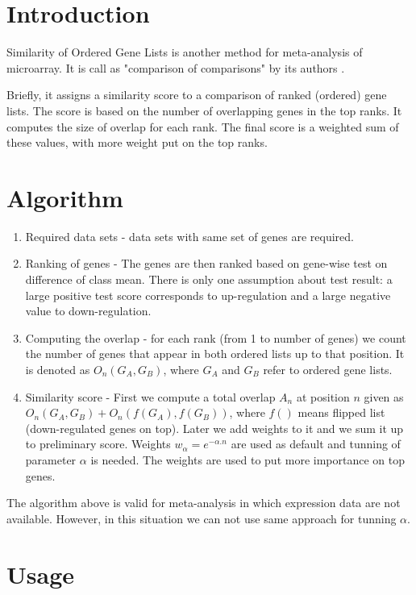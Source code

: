 \documentclass[a4paper]{report}
\begin{document}
\section*{Introduction}
Similarity of Ordered Gene Lists is another method for meta-analysis of microarray. It is call as "comparison of comparisons" by its authors \cite{SOGL}. \par
Briefly, it assigns a similarity score to a comparison of ranked (ordered) gene lists. The score is based on the number of overlapping genes in the top ranks. It computes the size of overlap for each rank. The final score is a weighted sum of these values, with more weight put on the top ranks. \par
\section*{Algorithm}
\begin{enumerate}
\item Required data sets - data sets with same set of genes are required. 
\item Ranking of genes - The genes are then ranked based on gene-wise test on difference of class mean. There is only one assumption about test result: a large positive test score corresponds to up-regulation and a large negative value to down-regulation. 
\item Computing the overlap - for each rank (from 1 to number of genes) we count the number of genes that appear in both ordered lists up to that position. It is denoted as $O_n(G_A,G_B)$, where $G_A$ and $G_B$ refer to ordered gene lists.
\item Similarity score - First we compute a total overlap $A_n$ at position $n$ given as $O_n(G_A,G_B)+O_n(f(G_A),f(G_B))$, where $f()$ means flipped list (down-regulated genes on top). Later we add weights to it and we sum it up to preliminary score. Weights $w_\alpha=e^{-\alpha.n}$ are used as default and tunning of parameter $\alpha$ is needed. The weights are used to put more importance on top genes. 

\end{enumerate}
The algorithm above is valid for meta-analysis in which expression data are not available. However, in this situation we can not use same approach for tunning $\alpha$. 
\section*{Usage}
\end{document}
